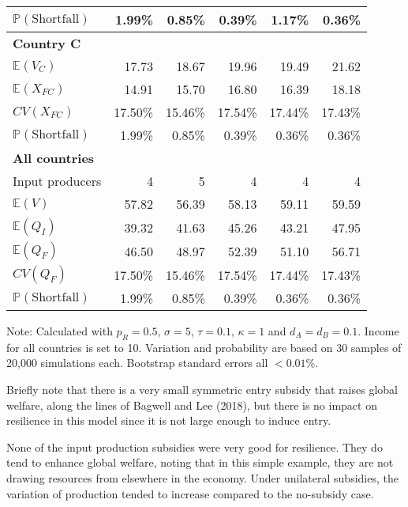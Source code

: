 \documentclass{article}
\begin{document}
\begin{table}
\begin{threeparttable}
\begin{tabular}{lrrrrr}
            $\mathbb{P}(\text{Shortfall})$ & 1.99\% & 0.85\% & 0.39\% & 1.17\% & 0.36\% \\ 
            \midrule
            \textbf{Country C} \\
            $\mathbb{E}(V_C)$ & 17.73 & 18.67 & 19.96 & 19.49 & 21.62 \\
            $\mathbb{E}(X_{FC})$ & 14.91 & 15.70 & 16.80 & 16.39 & 18.18 \\
            $CV(X_{FC})$ & 17.50\% & 15.46\% & 17.54\% & 17.44\% & 17.43\% \\
            $\mathbb{P}(\text{Shortfall})$ & 1.99\% & 0.85\% & 0.39\% & 0.36\% & 0.36\% \\ 
            \midrule
            \textbf{All countries} \\
            Input producers & 4 & 5 & 4 & 4 & 4 \\
            $\mathbb{E}(V)$ & 57.82 & 56.39 & 58.13 & 59.11 & 59.59 \\
            $\mathbb{E}(Q_{I})$ & 39.32 & 41.63 & 45.26 & 43.21 & 47.95 \\
            $\mathbb{E}(Q_{F})$ & 46.50 & 48.97 & 52.39 & 51.10 & 56.71 \\
            $CV(Q_{F})$ & 17.50\% & 15.46\% & 17.54\% & 17.44\% & 17.43\% \\
            $\mathbb{P}(\text{Shortfall})$ & 1.99\% & 0.85\% & 0.39\% & 0.36\% & 0.36\% \\ 
            \bottomrule
        \end{tabular}
        \begin{tablenotes}
            \small \item Note: Calculated with $p_R = 0.5$, $\sigma = 5$, $\tau = 0.1$, $\kappa = 1$ and $d_A = d_B = 0.1$. Income for all countries is set to 10. Variation and probability are based on 30 samples of 20,000 simulations each. Bootstrap standard errors all $<0.01\%$.
        \end{tablenotes}
    \end{threeparttable}
\end{table}

Briefly note that there is a very small symmetric entry subsidy that raises global welfare, along the lines of Bagwell and Lee (2018), but there is no impact on resilience in this model since it is not large enough to induce entry.

None of the input production subsidies were very good for resilience. They do tend to enhance global welfare, noting that in this simple example, they are not drawing resources from elsewhere in the economy. Under unilateral subsidies, the variation of production tended to increase compared to the no-subsidy case.
\end{document}
